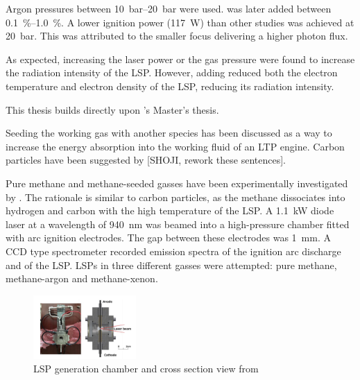         Argon pressures between \qtyrange{10}{20}{bar} were used.  was later added between \qtyrange{0.1}{1.0}{\%}. A lower ignition power (\qty{117}{W}) than other studies was achieved at \qty{20}{bar}. This was attributed to the smaller focus delivering a higher photon flux.
        
        As expected, increasing the laser power or the gas pressure were found to increase the radiation intensity of the LSP. However, adding  reduced both the electron temperature and electron density of the LSP, reducing its radiation intensity.


        This thesis builds directly upon \textcite{duplayArgonLaserPlasmaThruster2024a}'s Master's thesis. 



       

        



        Seeding the working gas with another species has been discussed as a way to increase the energy absorption into the working fluid of an LTP engine. Carbon particles have been suggested by [SHOJI, rework these sentences].

        Pure methane and methane-seeded gasses have been experimentally investigated by \textcite{kameiMethaneMethaneXenon2020}. The rationale is similar to carbon particles, as the methane dissociates into hydrogen and carbon with the high temperature of the LSP. A \qty{1.1}{kW} diode laser at a wavelength of \qty{940}{nm} was beamed into a high-pressure chamber fitted with arc ignition electrodes. The gap between these electrodes was \qty{1}{mm}. A CCD type spectrometer recorded emission spectra of the ignition arc discharge and of the LSP. LSPs in three different gasses were attempted: pure methane, methane-argon and methane-xenon.
        
        \begin{figure}[h]
            \centering
            \includegraphics[width=0.35\textwidth]{assets/2 background/Kamei apparatus.png}
            \caption{LSP generation chamber and cross section view from \textcite{kameiMethaneMethaneXenon2020}}
            \label{fig:Kamei}
        \end{figure}

